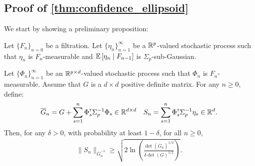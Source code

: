 \documentclass{article}
\begin{document}
\subsection{Proof of \autoref{thm:confidence_ellipsoid}}

We start by showing a preliminary proposition:

\begin{proposition}
\label{prop:concentration}
Let $\{F_n\}_{n=0}$ be a filtration.
Let $\{\eta_n\}_{n=1}^\infty$ be a $\mathbb{R}^p$-valued stochastic process such that $\eta_n$ is $F_n$-measurable and $\operatorname*{\mathbb{E}}\left[\eta_n\;\middle|\; F_{n-1}\right]$ is $\Sigma_p$-sub-Gaussian.

Let $\{\Phi_n\}_{n=1}^\infty$ be an $\mathbb{R}^{p\times d}$-valued stochastic process such that $\Phi_n$ is $F_n$-measurable. Assume that $G$ is a $d\times d$ positive definite matrix. For any $n\geq 0$, define:
\begin{equation*}
    \overline{G}_n = G + \sum_{s=1}^n \Phi_s^{\mathsf{\scriptscriptstyle T}} \Sigma_p^{-1} \Phi_s \in \mathbb{R}^{d\times d} \quad S_n = \sum_{s=1}^n \Phi_s^{\mathsf{\scriptscriptstyle T}}\Sigma_p^{-1}\eta_s \in \mathbb{R}^{d}.
\end{equation*}
Then, for any $\delta>0$, with probability at least $1-\delta$, for all $n\geq0$,
\begin{align*}
\| S_n \|_{\overline{G}_n^{-1}} \geq \sqrt{2\ln \left(\frac{\det\left(\overline{G}_n\right)^{1/2}}{\delta\det(G)^{1/2}}\right)}.
\end{align*}
\end{proposition}
\end{document}

